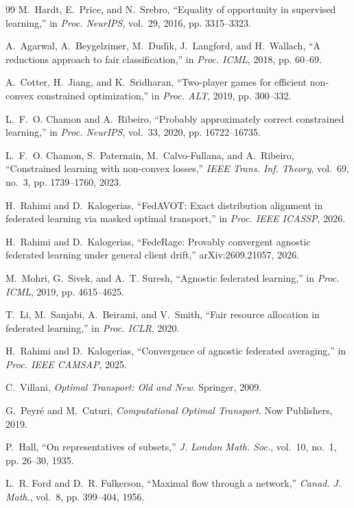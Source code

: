 \documentclass{article}
\theoremstyle{definition}
\begin{document}
\begin{thebibliography}{99}
M.~Hardt, E.~Price, and N.~Srebro, ``Equality of opportunity in supervised
learning,'' in \emph{Proc. NeurIPS}, vol.~29, 2016, pp. 3315--3323.

A.~Agarwal, A.~Beygelzimer, M.~Dud\'{\i}k, J.~Langford, and H.~Wallach,
``A reductions approach to fair classification,'' in \emph{Proc. ICML},
2018, pp. 60--69.

A.~Cotter, H.~Jiang, and K.~Sridharan, ``Two-player games for efficient
non-convex constrained optimization,'' in \emph{Proc. ALT}, 2019,
pp. 300--332.

L.~F.~O. Chamon and A.~Ribeiro, ``Probably approximately correct
constrained learning,'' in \emph{Proc. NeurIPS}, vol.~33, 2020,
pp. 16722--16735.

L.~F.~O. Chamon, S.~Paternain, M.~Calvo-Fullana, and A.~Ribeiro,
``Constrained learning with non-convex losses,'' \emph{IEEE Trans. Inf.
Theory}, vol.~69, no.~3, pp. 1739--1760, 2023.

H.~Rahimi and D.~Kalogerias, ``FedAVOT: Exact distribution alignment in
federated learning via masked optimal transport,'' in \emph{Proc. IEEE
ICASSP}, 2026.

H.~Rahimi and D.~Kalogerias, ``FedeRage: Provably convergent agnostic
federated learning under general client drift,'' arXiv:2609.21057, 2026.

M.~Mohri, G.~Sivek, and A.~T. Suresh, ``Agnostic federated learning,'' in
\emph{Proc. ICML}, 2019, pp. 4615--4625.

T.~Li, M.~Sanjabi, A.~Beirami, and V.~Smith, ``Fair resource allocation in
federated learning,'' in \emph{Proc. ICLR}, 2020.

H.~Rahimi and D.~Kalogerias, ``Convergence of agnostic federated
averaging,'' in \emph{Proc. IEEE CAMSAP}, 2025.

C.~Villani, \emph{Optimal Transport: Old and New}. Springer, 2009.

G.~Peyr\'e and M.~Cuturi, \emph{Computational Optimal Transport}. Now
Publishers, 2019.

P.~Hall, ``On representatives of subsets,'' \emph{J. London Math. Soc.},
vol.~10, no.~1, pp. 26--30, 1935.

L.~R. Ford and D.~R. Fulkerson, ``Maximal flow through a network,''
\emph{Canad. J. Math.}, vol.~8, pp. 399--404, 1956.


\end{thebibliography}
\end{document}
